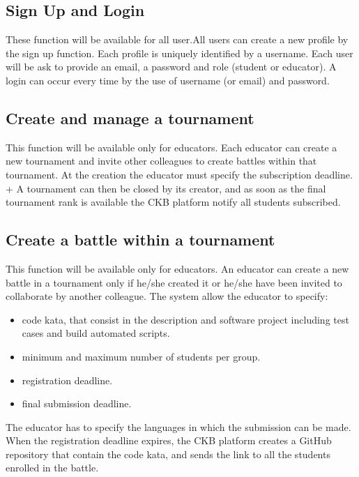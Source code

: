\subsection{Sign Up and Login}
These function will be available for all user.\newline All users can create a new profile by the sign up function. Each profile is uniquely identified by a username. Each user will be ask to provide an email, a password and role (student or educator). \newline
A login can occur every time by the use of username (or email) and password.

\subsection{Create and manage a tournament}
This function will be available only for educators. \newline
Each educator can create a new tournament and invite other colleagues to create battles within that tournament. At the creation the educator must specify the subscription deadline. +
A tournament can then be closed by its creator, and as soon as the final tournament rank is available the CKB platform notify all students subscribed.

\subsection{Create a battle within a tournament}
This function will be available only for educators. \newline 
An educator can create a new battle in a tournament only if he/she created it or he/she have been invited to collaborate by another colleague.
The system allow the educator to specify: 
\begin{itemize}
    \item code kata, that consist in the description and software project including test cases and build automated scripts.
    \item minimum and maximum number of students per group.
    \item registration deadline.
    \item final submission deadline.
\end{itemize}
The educator has to specify the languages in which the submission can be made.
When the registration deadline expires, the CKB platform creates a GitHub repository that contain the code kata, and sends the link to all the students enrolled in the battle.

